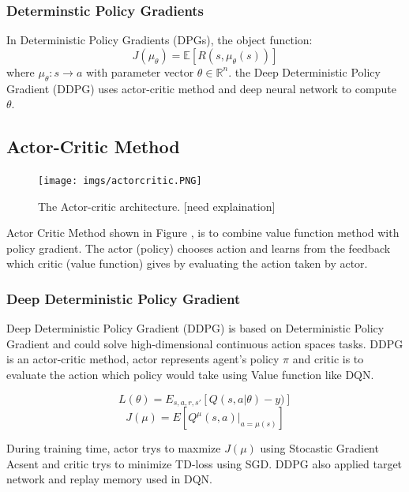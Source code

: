 \documentclass[11pt,twocolumn]{jarticle} %
\begin{document}
\subsubsection{Determinstic Policy Gradients\cite{dpg}}

In Deterministic Policy Gradients (DPGs), the object function:
$$J(\mu_\theta) = \mathbb{E}[R(s, \mu_\theta(s))]$$
where $\mu_\theta: s \rightarrow a$ with parameter vector $\theta \in \mathbb{R}^n$. the Deep Deterministic Policy Gradient (DDPG) uses actor-critic method and deep neural network to compute $\theta$.

\subsection{Actor-Critic Method}
\begin{figure}[h]
 \begin{center}
  \texttt{[image: imgs/actorcritic.PNG]}
  \caption{
  The Actor-critic architecture. [need explaination]
  }
  \label{fig:actorcritic}
 \end{center}
\end{figure}
Actor Critic Method shown in Figure \label{fig:actorcritic}, is to combine value function method with policy gradient. The actor (policy) chooses action and learns from the feedback which critic (value function) gives by evaluating the action taken by actor.

\subsubsection{Deep Deterministic Policy Gradient\cite{ddpg}}
Deep Deterministic Policy Gradient (DDPG) is based on Deterministic Policy Gradient \cite{dpg} and could solve high-dimensional continuous action spaces tasks. DDPG is an actor-critic method, actor represents agent's policy $\pi$ and critic is to evaluate the action which policy would take using Value function like DQN. 

\begin{equation}
L(\theta) = E_{s,a,r,s'}[Q(s, a|\theta) - y)] 
\end{equation}
\begin{equation}
J(\mu) = E[Q^\mu(s, a) | _{a=\mu(s)}]
\end{equation}

During training time, actor trys to maxmize $J(\mu)$ using Stocastic Gradient Acsent and critic trys to minimize TD-loss using SGD. DDPG also applied target network and replay memory used in DQN. \par
\end{document}
